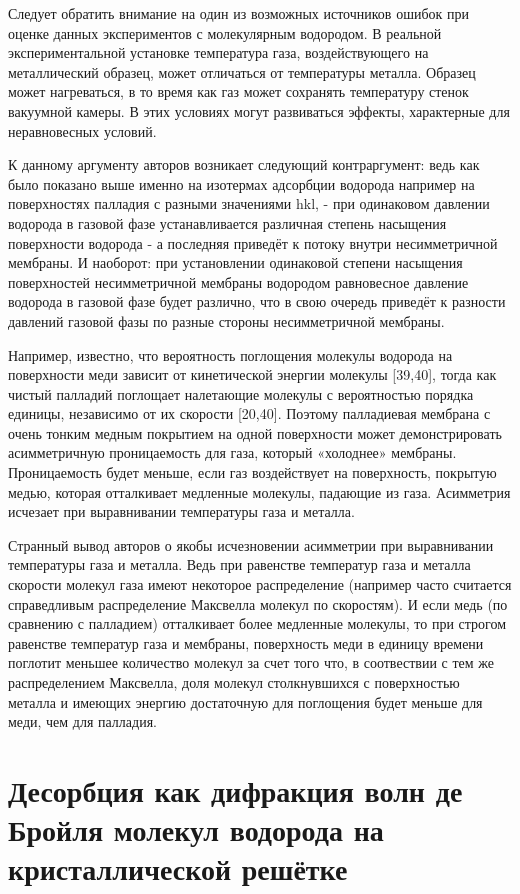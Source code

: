 \documentclass[11pt]{article}
\begin{document}
    Следует обратить внимание на один из возможных источников ошибок при
оценке данных экспериментов с молекулярным водородом. В реальной
экспериментальной установке температура газа, воздействующего на
металлический образец, может отличаться от температуры металла. Образец
может нагреваться, в то время как газ может сохранять температуру стенок
вакуумной камеры. В этих условиях могут развиваться эффекты, характерные
для неравновесных условий.

    К данному аргументу авторов возникает следующий контраргумент: ведь как
было показано выше именно на изотермах адсорбции водорода например на
поверхностях палладия с разными значениями hkl, - при одинаковом
давлении водорода в газовой фазе устанавливается различная степень
насыщения поверхности водорода - а последняя приведёт к потоку внутри
несимметричной мембраны. И наоборот: при установлении одинаковой степени
насыщения поверхностей несимметричной мембраны водородом равновесное
давление водорода в газовой фазе будет различно, что в свою очередь
приведёт к разности давлений газовой фазы по разные стороны
несимметричной мембраны.

    Например, известно, что вероятность поглощения молекулы водорода на
поверхности меди зависит от кинетической энергии молекулы {[}39,40{]},
тогда как чистый палладий поглощает налетающие молекулы с вероятностью
порядка единицы, независимо от их скорости {[}20,40{]}. Поэтому
палладиевая мембрана с очень тонким медным покрытием на одной
поверхности может демонстрировать асимметричную проницаемость для газа,
который «холоднее» мембраны. Проницаемость будет меньше, если газ
воздействует на поверхность, покрытую медью, которая отталкивает
медленные молекулы, падающие из газа. Асимметрия исчезает при
выравнивании температуры газа и металла.

    Странный вывод авторов о якобы исчезновении асимметрии при выравнивании
температуры газа и металла. Ведь при равенстве температур газа и металла
скорости молекул газа имеют некоторое распределение (например часто
считается справедливым распределение Максвелла молекул по скоростям). И
если медь (по сравнению с палладием) отталкивает более медленные
молекулы, то при строгом равенстве температур газа и мембраны,
поверхность меди в единицу времени поглотит меньшее количество молекул
за счет того что, в соотвествии с тем же распределением Максвелла, доля
молекул столкнувшихся с поверхностью металла и имеющих энергию
достаточную для поглощения будет меньше для меди, чем для палладия.

    \section{Десорбция как дифракция волн де Бройля молекул водорода на
кристаллической
решётке}\label{ux434ux435ux441ux43eux440ux431ux446ux438ux44f-ux43aux430ux43a-ux434ux438ux444ux440ux430ux43aux446ux438ux44f-ux432ux43eux43bux43d-ux434ux435-ux431ux440ux43eux439ux43bux44f-ux43cux43eux43bux435ux43aux443ux43b-ux432ux43eux434ux43eux440ux43eux434ux430-ux43dux430-ux43aux440ux438ux441ux442ux430ux43bux43bux438ux447ux435ux441ux43aux43eux439-ux440ux435ux448ux451ux442ux43aux435}
\end{document}
